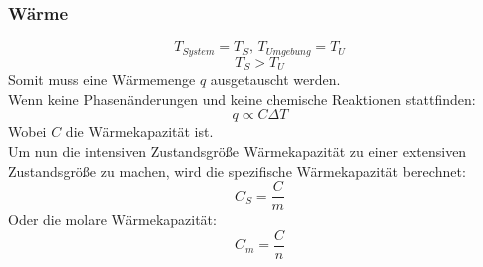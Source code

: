 \documentclass[a4paper]{article}
\begin{document}
\subsubsection{Wärme}
\begin{equation*}
    T_{System} = T_S,\,T_{Umgebung} = T_U
\end{equation*}
\begin{equation*}
    T_S > T_U
\end{equation*}
Somit muss eine Wärmemenge $q$ ausgetauscht werden.\\
Wenn keine Phasenänderungen und keine chemische Reaktionen stattfinden:
\begin{equation*}
    q \varpropto C \Delta T
\end{equation*}
Wobei $C$ die Wärmekapazität ist.\\
Um nun die intensiven Zustandsgröße Wärmekapazität zu einer extensiven Zustandsgröße zu machen, wird die spezifische Wärmekapazität berechnet:
\begin{equation*}
    C_S = \frac{C}{m}
\end{equation*}
Oder die molare Wärmekapazität:
\begin{equation*}
    C_m = \frac{C}{n}
\end{equation*}
\end{document}

